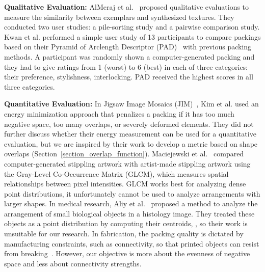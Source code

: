 \textbf{Qualitative Evaluation:}
AlMeraj et al.~\cite{AlMerajEval2013} proposed qualitative evaluations to measure
the similarity between exemplars and synthesized textures.
They conducted two user studies: a pile-sorting study and a pairwise comparison study.
Kwan et al. performed a simple user study of 13 participants to compare 
packings based on their Pyramid of Arclength Descriptor (PAD)~\cite{Kwan2016} with previous packing methods.
A participant was randomly shown a computer-generated packing and they had to give ratings from 1 (worst) to 6 (best)
in each of three categories: their preference, stylishness, interlocking.
 PAD received the highest scores in all three categories.

\newtext
{
\textbf{Quantitative Evaluation:}
In Jigsaw Image Mosaics (JIM)~\cite{Kim2002}, Kim et al. used an energy minimization approach
that penalizes a packing if it has too much negative space,
too many overlaps, or severely deformed elements. 
They did not further discuss whether their energy measurement can be used for a quantitative evaluation,
but we are inspired by their work to develop a metric based on shape overlaps (Section~\ref{section_overlap_function}).
Maciejewski et al.~\cite{Maciejewski2008} compared computer-generated stippling artwork
with artist-made stippling artwork using the Gray-Level Co-Occurrence Matrix (GLCM),
which measures spatial relationships between pixel intensities.
GLCM works best for analyzing dense point distributions,  it unfortunately cannot be used to analyze arrangements with larger shapes.
In medical research, Aliy et al.~\cite{Aliy2013} proposed a method to analyze the arrangement of 
small biological objects in a histology image.
They treated these objects as a point distribution by computing their centroids, 
, 
so their work is unsuitable for our research.
In fabrication, the packing quality is dictated by manufacturing constraints, such as connectivity,
so that printed objects can resist from breaking~\cite{Chen2016, Zehnder2016, Martinez2019}.
However, our objective is more about the evenness of negative space and less about connectivity strengths.
}


